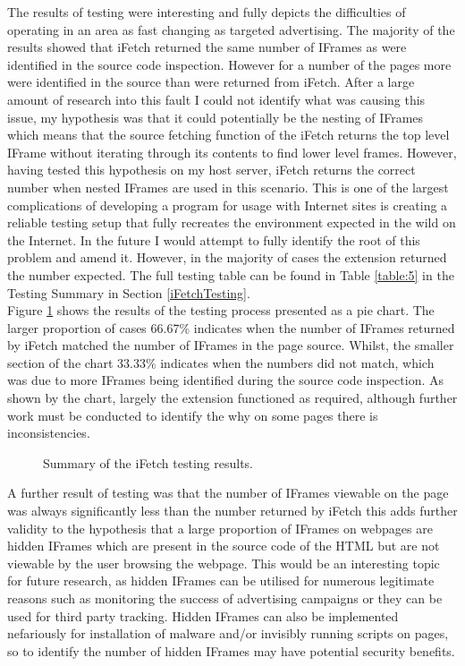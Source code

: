 \documentclass[12pt]{article}
\begin{document}
The results of testing were interesting and fully depicts the difficulties of operating in an area as fast changing as targeted advertising. The majority of the results showed that iFetch returned the same number of IFrames as were identified in the source code inspection. However for a number of the pages more were identified in the source than were returned from iFetch. After a large amount of research into this fault I could not identify what was causing this issue, my hypothesis was that it could potentially be the nesting of IFrames which means that the source fetching function of the iFetch returns the top level IFrame without iterating through its contents to find lower level frames. However, having tested this hypothesis on my host server, iFetch returns the correct number when nested IFrames are used in this scenario. This is one of the largest complications of developing a program for usage with Internet sites is creating a reliable testing setup that fully recreates the environment expected in the wild on the Internet. In the future I would attempt to fully identify the root of this problem and amend it. However, in the majority of cases the extension returned the number expected. The full testing table can be found in Table \ref{table:5} in the Testing Summary in Section \ref{iFetchTesting}. \\

Figure \ref{fig:ifPie} shows the results of the testing process presented as a pie chart. The larger proportion of cases 66.67\% indicates when the number of IFrames returned by iFetch matched the number of IFrames in the page source. Whilst, the smaller section of the chart 33.33\% indicates when the numbers did not match, which was due to more IFrames being identified during the source code inspection. As shown by the chart, largely the extension functioned as required, although further work must be conducted to identify the why on some pages there is inconsistencies.  

\begin{figure} [H]
    \centering
        \caption{Summary of the iFetch testing results.}
        \label{fig:ifPie}
\end{figure}

A further result of testing was that the number of IFrames viewable on the page was always significantly less than the number returned by iFetch this adds further validity to the hypothesis that a large proportion of IFrames on webpages are hidden IFrames which are present in the source code of the HTML but are not viewable by the user browsing the webpage. This would be an interesting topic for future research, as hidden IFrames can be utilised for numerous legitimate reasons such as monitoring the success of advertising campaigns or they can be used for third party tracking. Hidden IFrames can also be implemented nefariously for installation of malware and/or invisibly running scripts on pages, so to identify the number of hidden IFrames may have potential security benefits. 
\end{document}
